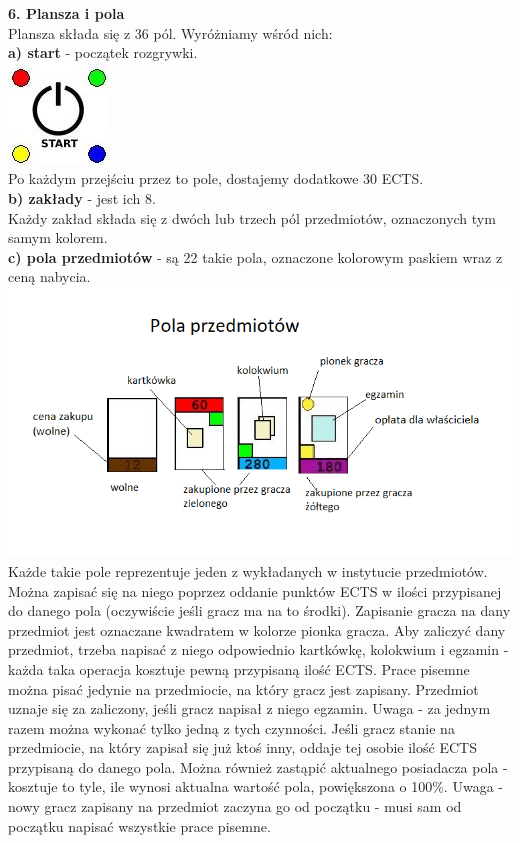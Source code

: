 \documentclass[a4paper]{article}
\begin{document}
\noindent \textbf{6. Plansza i pola}\\
Plansza składa się z 36 pól. Wyróżniamy wśród nich:\\
\noindent \textbf{a) start} - początek rozgrywki.\\ 
\indent\includegraphics[scale=0.6]{start.png}\\
\indent Po każdym przejściu przez to pole, dostajemy dodatkowe 30 ECTS.\\

\noindent \textbf{b) zakłady} - jest ich 8.\\
\noindent Każdy zakład składa się z dwóch lub trzech pól przedmiotów, oznaczonych tym samym kolorem.\\

\noindent \textbf{c) pola przedmiotów} - są 22 takie pola, oznaczone kolorowym paskiem wraz z ceną nabycia.\\
\indent \includegraphics[scale=0.8]{pola.png}\\
\noindent Każde takie pole reprezentuje jeden z wykładanych w instytucie przedmiotów. Można zapisać się na niego poprzez oddanie punktów ECTS w ilości przypisanej do danego pola (oczywiście jeśli gracz ma na to środki). Zapisanie gracza na dany przedmiot jest oznaczane kwadratem w kolorze pionka gracza. Aby zaliczyć dany przedmiot, trzeba napisać z niego odpowiednio kartkówkę, kolokwium i egzamin - każda taka operacja kosztuje pewną przypisaną ilość ECTS. Prace pisemne można pisać jedynie na przedmiocie, na który gracz jest zapisany. Przedmiot uznaje się za zaliczony, jeśli gracz napisał z niego egzamin. Uwaga - za jednym razem można wykonać tylko jedną z tych czynności. Jeśli gracz stanie na przedmiocie, na który zapisał się już ktoś inny, oddaje tej osobie ilość ECTS przypisaną do danego pola. Można również zastąpić aktualnego posiadacza pola - kosztuje to tyle, ile wynosi aktualna wartość pola, powiększona o 100\%. Uwaga - nowy gracz zapisany na przedmiot zaczyna go od początku - musi sam od początku napisać wszystkie prace pisemne.\\ 
\end{document}
